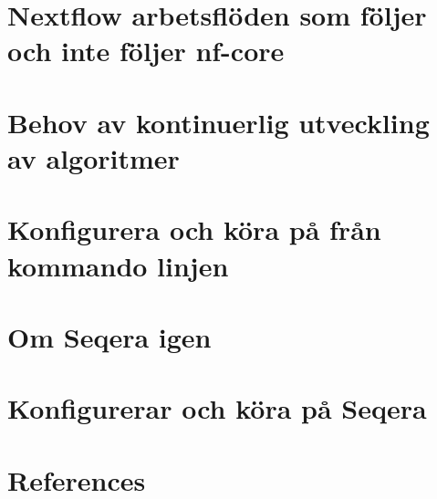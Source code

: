 \documentclass[
  letterpaper,
  DIV=11,
  numbers=noendperiod]{scrreprt}
\newlength{\cslhangindent}
\newenvironment{CSLReferences}[2] %
 {\begin{list}{}{%
  \setlength{\itemindent}{0pt}
  \setlength{\leftmargin}{0pt}
  \setlength{\parsep}{0pt}
  \ifodd #1
   \setlength{\leftmargin}{\cslhangindent}
   \setlength{\itemindent}{-1\cslhangindent}
  \fi
  \setlength{\itemsep}{#2\baselineskip}}}
 {\end{list}}
\begin{document}
\chapter{Nextflow arbetsflöden som följer och inte följer
nf-core}\label{nextflow-arbetsfluxf6den-som-fuxf6ljer-och-inte-fuxf6ljer-nf-core}


\chapter{Behov av kontinuerlig utveckling av
algoritmer}\label{behov-av-kontinuerlig-utveckling-av-algoritmer}


\chapter{Konfigurera och köra på från kommando
linjen}\label{konfigurera-och-kuxf6ra-puxe5-fruxe5n-kommando-linjen}


\chapter{Om Seqera igen}\label{om-seqera-igen}


\chapter{Konfigurerar och köra på
Seqera}\label{konfigurerar-och-kuxf6ra-puxe5-seqera}


\chapter*{References}\label{references}


\label{refs}
\begin{CSLReferences}{0}{1}
\end{CSLReferences}
\end{document}
